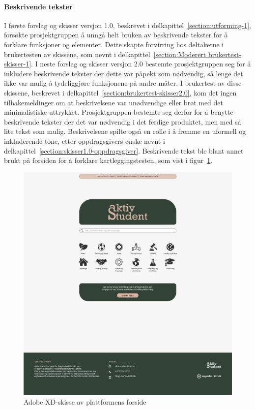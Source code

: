 \paragraph{Beskrivende tekster}
I første forslag og skisser versjon 1.0, beskrevet i delkapittel~\ref{section:utforming-1}, forsøkte prosjektgruppen å unngå helt bruken av beskrivende tekster for å forklare funksjoner og elementer. Dette skapte forvirring hos deltakerne i brukertesten av skissene, som nevnt i delkapittel~\ref{section:Moderert brukertest-skisser-1}. I neste forslag og skisser versjon 2.0 bestemte prosjektgruppen seg for å inkludere beskrivende tekster der dette var påpekt som nødvendig, så lenge det ikke var mulig å tydeliggjøre funksjonene på andre måter. I brukertest av disse skissene, beskrevet i delkapittel~\ref{section:brukertest-skisser2.0}, kom det ingen tilbakemeldinger om at beskrivelsene var unødvendige eller brøt med det minimalistiske uttrykket. Prosjektgruppen bestemte seg derfor for å benytte beskrivende tekster der det var nødvendig i det ferdige produktet, men med så lite tekst som mulig. Beskrivelsene spilte også en rolle i å fremme en uformell og inkluderende tone, etter oppdragsgivers ønske nevnt i delkapittel~\ref{section:skisser1.0-oppdragsgiver}. Beskrivende tekst ble blant annet brukt på forsiden for å forklare kartleggingstesten, som vist i figur~\ref{fig:3-1-forside}.

\begin{figure}[H]
\centering
\includegraphics[width=.7\textwidth]{Illustrasjoner/Skisser-pdf/3.0/3-1-forside.pdf}
\caption{Adobe XD-skisse av plattformens forside}
\label{fig:3-1-forside}
\end{figure}


